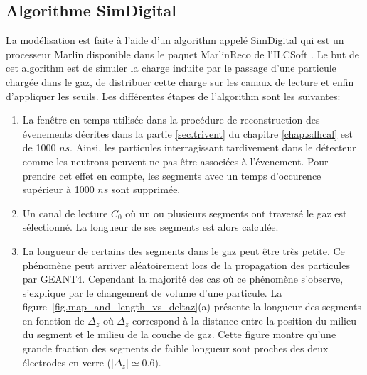 \subsection{Algorithme SimDigital}
La modélisation est faite à l'aide d'un algorithm appelé SimDigital qui est un processeur Marlin \cite{marlin} disponible dans le paquet MarlinReco \cite{marlinreco} de l'ILCSoft \cite{ilcsoft}. Le but de cet algorithm est de simuler la charge induite par le passage d'une particule chargée dans le gaz, de distribuer cette charge sur les canaux de lecture et enfin d'appliquer les seuils. Les différentes étapes de l'algorithm sont les suivantes:
\begin{enumerate}[~~1-]
\item La fenêtre en temps utilisée dans la procédure de reconstruction des évenements décrites dans la partie \ref{sec.trivent} du chapitre \ref{chap.sdhcal} est de 1000 $ns$. Ainsi, les particules interragissant tardivement dans le détecteur comme les neutrons peuvent ne pas être associées à l'évenement. Pour prendre cet effet en compte, les segments avec un temps d'occurence supérieur à 1000 $ns$ sont supprimée.
\item \label{it.start} Un canal de lecture $C_0$ où un ou plusieurs segments ont traversé le gaz est sélectionné. La longueur de ses segments est alors calculée.
\item La longueur de certains des segments dans le gaz peut être très petite. Ce phénomène peut arriver aléatoirement lors de la propagation des particules par GEANT4. Cependant la majorité des cas où ce phénomène s'observe, s'explique par le changement de volume d'une particule. La figure~\ref{fig.map_and_length_vs_deltaz}(a) présente la longueur des segments en fonction de $\Delta_z$ où $\Delta_z$ correspond à la distance entre la position du milieu du segment et le milieu de la couche de gaz. Cette figure montre qu'une grande fraction des segments de faible longueur sont proches des deux électrodes en verre ($|\Delta_z|\simeq0.6$).
  \begin{figure}[!ht]

\end{figure}
\end{enumerate}
